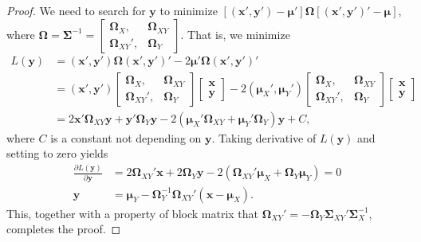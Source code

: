 \documentclass[12pt]{article}
\begin{document}
\begin{proof}
We need to search for $\bm y$ to minimize $[(\bm x', \bm y') - \bm \mu'] \bm \Omega [(\bm x', \bm y')' - \bm \mu]$, where $\bm \Omega = \bm \Sigma^{-1} = \left[
\begin{array}{cc}
\bm \Omega_{X},      & \bm \Omega_{XY} \\
\bm \Omega_{XY}',   & \bm \Omega_{Y}
\end{array}\right]$.
That is, we minimize
\begin{align*}
L(\bm y) &= (\bm x', \bm y') \bm \Omega (\bm x', \bm y')' - 2\bm \mu' \bm \Omega (\bm x', \bm y')'  \\
&= (\bm x', \bm y') \left[
\begin{array}{cc}
\bm \Omega_{X},      & \bm \Omega_{XY} \\
\bm \Omega_{XY}',   & \bm \Omega_{Y}
\end{array}\right]
\left[
\begin{array}{cc}
\bm x \\
\bm y
\end{array}\right] - 2 (\bm \mu_{X}', \bm \mu_{Y}') \left[
\begin{array}{cc}
\bm \Omega_{X},      & \bm \Omega_{XY} \\
\bm \Omega_{XY}',   & \bm \Omega_{Y}
\end{array}\right]
\left[
\begin{array}{cc}
\bm x \\
\bm y
\end{array}\right]        \\
&= 2 \bm x' \bm \Omega_{XY} \bm y + \bm y' \bm \Omega_{Y} \bm y - 2 (\bm \mu_{X}' \bm \Omega_{XY} + \bm \mu_{Y}' \bm \Omega_{Y}) \bm y + C,
\end{align*}
where $C$ is a constant not depending on $\bm y$.
Taking derivative of $L(\bm y)$ and setting to zero yields
\begin{align*}
\frac{\partial L(\bm y)}{\partial \bm y} &= 2 \bm \Omega_{XY}' \bm x + 2 \bm \Omega_{Y} \bm y - 2 (\bm \Omega_{XY}' \bm \mu_{X} + \bm \Omega_{Y} \bm \mu_{Y}) = 0 \\
\bm y &= \bm \mu_{Y} - \bm \Omega_{Y}^{-1} \bm \Omega_{XY}' (\bm x - \bm \mu_{X}).
\end{align*}
This, together with a property of block matrix that $\bm \Omega_{XY}' = - \bm \Omega_{Y} \bm \Sigma_{XY}' \bm \Sigma_{X}^{-1}$, completes the proof.
\end{proof}
\end{document}
